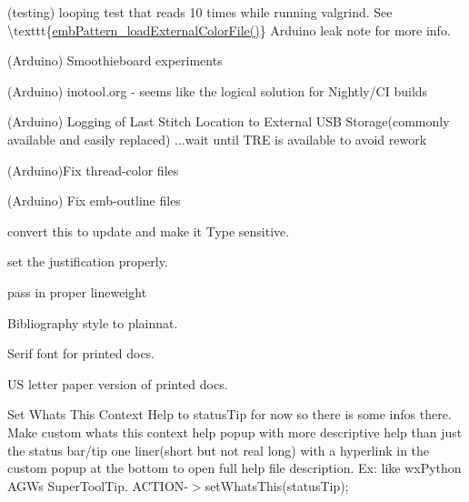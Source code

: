 \begin{DoxyRefList}
\label{todo__todo000206}%
%
(testing) looping test that reads 10 times while running valgrind. See \textbackslash{}texttt\{\mbox{\hyperlink{embroidery_8h_a3bf191bd99e2da8d36465f454a4646f6}{emb\+Pattern\+\_\+load\+External\+Color\+File()}}\} Arduino leak note for more info.

\label{todo__todo000205}%
%
(Arduino) Smoothieboard experiments

\label{todo__todo000204}%
%
(Arduino) inotool.\+org -\/ seems like the logical solution for Nightly/\+CI builds

\label{todo__todo000203}%
%
(Arduino) Logging of Last Stitch Location to External USB Storage(commonly available and easily replaced) ...wait until TRE is available to avoid rework

\label{todo__todo000202}%
%
(Arduino)Fix thread-\/color files

\label{todo__todo000201}%
%
(Arduino) Fix emb-\/outline files 
\item[Member \mbox{\hyperlink{classGeometry_a1545e793f7715b0886a884790622f847}{Geometry\+::calculate\+Arc\+Data}} (Emb\+Arc arc)]\label{todo__todo000022}%
%
convert this to update and make it Type sensitive.  
\item[Member \mbox{\hyperlink{classGeometry_a3a2630a232e7ee84a0ac8fa76ba70523}{Geometry\+::init\+\_\+text\+\_\+single}} (QString str, Emb\+Vector position, QRgb rgb, Qt\+::\+Pen\+Style line\+Type)]\label{todo__todo000021}%
%
set the justification properly. 



pass in proper lineweight  
\item[Page \mbox{\hyperlink{Ideas}{Ideas}} ]\label{todo__todo000196}%
%
Bibliography style to plainnat.

\label{todo__todo000197}%
%
Serif font for printed docs.

\label{todo__todo000198}%
%
US letter paper version of printed docs. 
\item[Member \mbox{\hyperlink{classMainWindow_a5de9bc12f363ba45fb8082f262d24deb}{Main\+Window\+::create\+All\+Actions}} ()]\label{todo__todo000017}%
%
Set What\textquotesingle{}s This Context Help to status\+Tip for now so there is some infos there. Make custom whats this context help popup with more descriptive help than just the status bar/tip one liner(short but not real long) with a hyperlink in the custom popup at the bottom to open full help file description. Ex\+: like wx\+Python AGW\textquotesingle{}s Super\+Tool\+Tip. ACTION-\/\texorpdfstring{$>$}{>}set\+Whats\+This(status\+Tip); 




\end{DoxyRefList}
